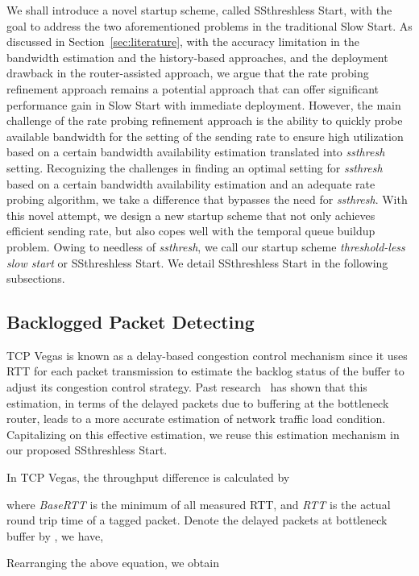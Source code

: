 \documentclass[12pt,onecolumn]{IEEEtran}
\begin{document}
We shall introduce a novel startup scheme, called SSthreshless Start, with the
goal to address the two aforementioned problems in the traditional Slow Start.
As discussed in Section~\ref{sec:literature}, with the accuracy limitation in
the bandwidth estimation and the history-based approaches, and the deployment
drawback in the router-assisted approach, we argue that the rate probing
refinement approach remains a potential approach that can offer significant
performance gain in Slow Start with immediate deployment. However, the main
challenge of the rate probing refinement approach is the ability to quickly
probe available bandwidth for the setting of the sending rate to ensure high
utilization based on a certain bandwidth availability estimation translated
into \emph{ssthresh} setting. Recognizing the challenges in finding an optimal
setting for \emph{ssthresh} based on a certain bandwidth availability
estimation and an adequate rate probing algorithm, we take a difference that
bypasses the need for \emph{ssthresh}. With this novel attempt, we design a new
startup scheme that not only achieves efficient sending rate, but also copes
well with the temporal queue buildup problem. Owing to needless of \emph{ssthresh}, we
call our startup scheme \emph{threshold-less slow start} or SSthreshless Start.
We detail SSthreshless Start in the following subsections.


\subsection{Backlogged Packet Detecting}

TCP Vegas is known as a delay-based congestion control mechanism since it uses
RTT for each packet transmission to estimate the backlog status of the buffer
to adjust its congestion control strategy. Past research~\cite{vegas1,vegas}
has shown that this estimation, in terms of the delayed packets due to
buffering at the bottleneck router, leads to a more accurate estimation of
network traffic load condition. Capitalizing on this effective estimation, we
reuse this estimation mechanism in our proposed SSthreshless Start.

In TCP Vegas, the throughput difference is calculated by

where \emph{BaseRTT} is the minimum of all measured RTT, and \emph{RTT} is the
actual round trip time of a tagged packet. Denote the delayed packets at
bottleneck buffer by , we have,


Rearranging the above equation, we obtain
\end{document}

